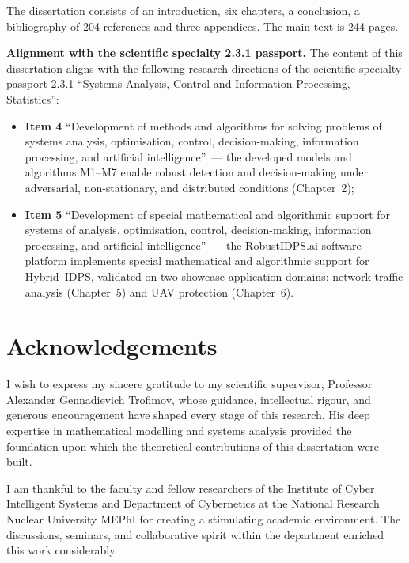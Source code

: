 The dissertation consists of an introduction, six chapters, a conclusion, a bibliography of 204 references and three appendices. The main text is 244 pages.

\medskip
\noindent\textbf{Alignment with the scientific specialty 2.3.1 passport.}
The content of this dissertation aligns with the following research directions of the scientific specialty passport 2.3.1 ``Systems Analysis, Control and Information Processing, Statistics'':
\begin{itemize}\setlength\itemsep{0.18em}
\item \textbf{Item 4} ``Development of methods and algorithms for solving problems of systems analysis, optimisation, control, decision-making, information processing, and artificial intelligence''~--- the developed models and algorithms M1--M7 enable robust detection and decision-making under adversarial, non-stationary, and distributed conditions (Chapter~2);
\item \textbf{Item 5} ``Development of special mathematical and algorithmic support for systems of analysis, optimisation, control, decision-making, information processing, and artificial intelligence''~--- the \textsf{RobustIDPS.ai} software platform implements special mathematical and algorithmic support for Hybrid~IDPS, validated on two showcase application domains: network-traffic analysis (Chapter~5) and UAV protection (Chapter~6).
\end{itemize}

\chapter*{Acknowledgements}

I wish to express my sincere gratitude to my scientific supervisor, Professor Alexander Gennadievich Trofimov, whose guidance, intellectual rigour, and generous encouragement have shaped every stage of this research. His deep expertise in mathematical modelling and systems analysis provided the foundation upon which the theoretical contributions of this dissertation were built.

I am thankful to the faculty and fellow researchers of the Institute of Cyber Intelligent Systems and Department of Cybernetics at the National Research Nuclear University MEPhI for creating a stimulating academic environment. The discussions, seminars, and collaborative spirit within the department enriched this work considerably.

